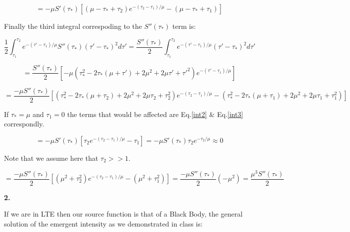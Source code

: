 \documentclass[12pt]{article}
\begin{document}
\begin{equation}\label{int2}
= -\mu S'(\tau_*)\left[ (\mu - \tau_* + \tau_2)e^{-(\tau_2 - \tau_1)/\mu} - (\mu - \tau_* + \tau_1) \right]
\end{equation}


Finally the third integral correspoding to the $S''(\tau_*)$ term is:

\begin{equation*}
\dfrac{1}{2}\int_{\tau_1}^{\tau_2}e^{-(\tau ' - \tau_1)/\mu} S''(\tau_*)(\tau ' - \tau_*)^2 d\tau' = \dfrac{S''(\tau_*)}{2} \int_{\tau_1}^{\tau_2}e^{-(\tau ' - \tau_1)/\mu} (\tau ' - \tau_*)^2 d\tau'  
\end{equation*}

\begin{equation*}
 =  \dfrac{S''(\tau_*)}{2} \left[-\mu (\tau_{*}^2 - 2\tau_*(\mu+\tau') + 2\mu^2 + 2\mu \tau' + \tau'^2)e^{-(\tau'-\tau_1)/{\mu}} \right]
\end{equation*}

\begin{equation}\label{int3}
= \dfrac{-\mu S''(\tau_*)}{2} \left[ (\tau_{*}^2 - 2\tau_*(\mu+\tau_2) + 2\mu^2 + 2\mu \tau_2 + \tau_{2}^2)e^{-(\tau_2 -\tau_1)/{\mu}} - (\tau_{*}^2 - 2\tau_*(\mu+\tau_1) + 2\mu^2 + 2\mu \tau_1+ \tau_{1}^2) \right]
\end{equation}

If $\tau_* = \mu$ and $\tau_1 = 0$ the terms that would be affected are Eq.\ref{int2} \& Eq.\ref{int3}
correspondly.

\begin{equation}
 = -\mu S'(\tau_*)\left[ \tau_2 e^{-(\tau_2-\tau_1)/\mu} - \tau_1\right] = -\mu S'(\tau_*) \tau_2 e^{-\tau_2/\mu} \approx 0
\end{equation}

Note that we assume here that $\tau_2 >>1$.

\begin{equation}
= \dfrac{-\mu S''(\tau_*)}{2} \left[ (\mu^2 + \tau_{2}^2)e^{-(\tau_2 -\tau_1)/{\mu}} - (\mu^2 + \tau_{1}^2) \right] = \dfrac{-\mu S''(\tau_*)}{2} ( -\mu^2 ) = \dfrac{\mu^3 S''(\tau_*)}{2}
\end{equation}


\begin{LARGE}
\textbf{2.}
\end{LARGE}

If we are in LTE then our source function is that of a Black 
Body,  the general solution of the emergent intensity as we demonstrated
in class is:
\end{document}
